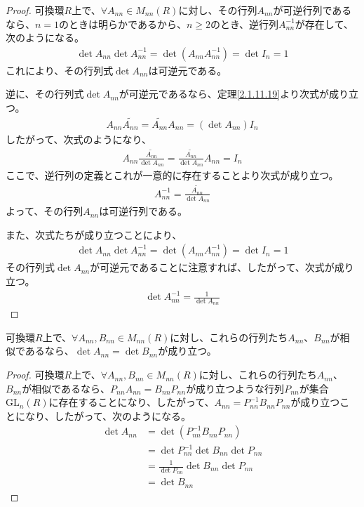 \documentclass[dvipdfmx]{jsarticle}
\begin{document}
\begin{proof}
可換環$R$上で、$\forall A_{nn} \in M_{nn}(R)$に対し、その行列$A_{nn}$が可逆行列であるなら、$n = 1$のときは明らかであるから、$n \geq 2$のとき、逆行列$A_{nn}^{- 1}$が存在して、次のようになる。
\begin{align*}
\det A_{nn}\det A_{nn}^{- 1} = \det\left( A_{nn}A_{nn}^{- 1} \right) = \det I_{n} = 1
\end{align*}
これにより、その行列式$\det A_{nn}$は可逆元である。\par
逆に、その行列式$\det A_{nn}$が可逆元であるなら、定理\ref{2.1.11.19}より次式が成り立つ。
\begin{align*}
A_{nn}\widetilde{A_{nn}} = \widetilde{A_{nn}}A_{nn} = \left( \det A_{nn} \right)I_{n}
\end{align*}
したがって、次式のようになり、
\begin{align*}
A_{nn}\frac{\widetilde{A_{nn}}}{\det A_{nn}} = \frac{\widetilde{A_{nn}}}{\det A_{nn}}A_{nn} = I_{n}
\end{align*}
ここで、逆行列の定義とこれが一意的に存在することより次式が成り立つ。
\begin{align*}
A_{nn}^{- 1} = \frac{\widetilde{A_{nn}}}{\det A_{nn}}
\end{align*}
よって、その行列$A_{nn}$は可逆行列である。\par
また、次式たちが成り立つことにより、
\begin{align*}
\det A_{nn}\det A_{nn}^{- 1} = \det\left( A_{nn}A_{nn}^{- 1} \right) = \det I_{n} = 1
\end{align*}
その行列式$\det A_{nn}$が可逆元であることに注意すれば、したがって、次式が成り立つ。
\begin{align*}
\det A_{nn}^{- 1} = \frac{1}{\det A_{nn}}
\end{align*}
\end{proof}
\begin{thm}\label{2.1.11.20}
可換環$R$上で、$\forall A_{nn},B_{nn} \in M_{nn}(R)$に対し、これらの行列たち$A_{nn}$、$B_{nn}$が相似であるなら、$\det A_{nn} = \det B_{nn}$が成り立つ。
\end{thm}
\begin{proof}
可換環$R$上で、$\forall A_{nn},B_{nn} \in M_{nn}(R)$に対し、これらの行列たち$A_{nn}$、$B_{nn}$が相似であるなら、$P_{nn}A_{nn} = B_{nn}P_{nn}$が成り立つような行列$P_{nn}$が集合$\mathrm{GL}_{n}(R)$に存在することになり、したがって、$A_{nn} = P_{nn}^{- 1}B_{nn}P_{nn}$が成り立つことになり、したがって、次のようになる。
\begin{align*}
\det A_{nn} &= \det\left( P_{nn}^{- 1}B_{nn}P_{nn} \right)\\
&= \det P_{nn}^{- 1}\det B_{nn}\det P_{nn}\\
&= \frac{1}{\det P_{nn}}\det B_{nn}\det P_{nn}\\
&= \det B_{nn}
\end{align*}
\end{proof}
\end{document}
